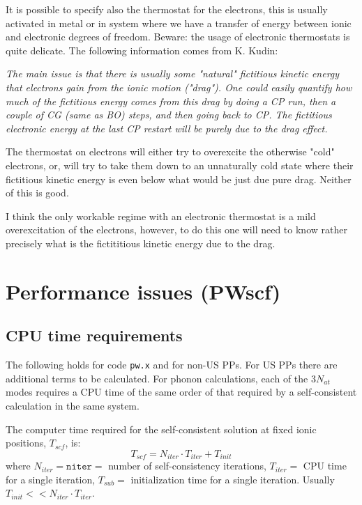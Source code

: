 \documentclass[12pt,a4paper]{article}
\begin{document}
\begin{enumerate}
    It is possible to specify also the thermostat for the electrons,
    this is usually activated in metal or in system where we have a
    transfer of energy between ionic and electronic degrees of
    freedom. Beware: the usage of electronic thermostats is quite
    delicate. The following information comes from K. Kudin:
    {\em The main issue is that there is usually some "natural" fictitious
    kinetic energy that electrons gain from the ionic motion ("drag"). One
    could easily quantify how much of the fictitious energy comes from this
    drag by doing a CP run, then a couple of CG (same as BO) steps, and
    then going back to CP. The fictitious electronic energy at the last CP
    restart will be purely due to the drag effect.

    The thermostat on electrons will either try to overexcite the
    otherwise "cold" electrons, or, will try to take them down to an
    unnaturally cold state where their fictitious kinetic energy is even
    below what would be just due pure drag. Neither of this is good.

    I think the only workable regime with an electronic thermostat is a
    mild overexcitation of the electrons, however, to do this one will need
    to know rather precisely what is the fictititious kinetic energy due to
    the drag.}

\end{enumerate}


\clearpage

\section{Performance issues (PWscf)}
  \label{performance}

\subsection{CPU time requirements}

The following holds for code {\tt pw.x} and for non-US PPs. 
For US PPs there are additional terms to be calculated.
For phonon calculations, each of the $3 N_{at}$ modes requires a CPU
time of the same order of that required by a self-consistent 
calculation in the same system.

The computer time required for the self-consistent solution at fixed
ionic positions, $T_{scf}$, is:
$$
T_{scf} = N_{iter} \cdot T_{iter} + T_{init}
$$
where $N_{iter}=\mathtt{niter}=$ number of self-consistency
iterations, $T_{iter}=$ CPU time for a single iteration,
$T_{sub}=$ initialization time for a single iteration. 
Usually $T_{init} << N_{iter} \cdot T_{iter}$.
\end{document}
